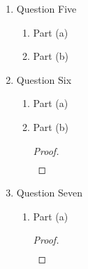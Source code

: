 \documentclass{article}
\begin{document}
\begin{enumerate}
    \begin{enumerate}
        \item Part (a)
        \item Part (b)
        \begin{proof}
            \begin{align}
                &
            \end{align}
        \end{proof}
    \end{enumerate}
    \item Question Five
    \begin{enumerate}
        \item Part (a)
        \item Part (b)
    \end{enumerate}
    \item Question Six
    \begin{enumerate}
        \item Part (a)
        \item Part (b)
        \begin{proof}
            \begin{align}
                &
            \end{align}
        \end{proof}
    \end{enumerate}
    \item Question Seven
    \begin{enumerate}
        \item Part (a)
        \begin{proof}
            \begin{align}
                &
            \end{align}
        \end{proof}
    \end{enumerate}
\end{enumerate}
\end{document}
